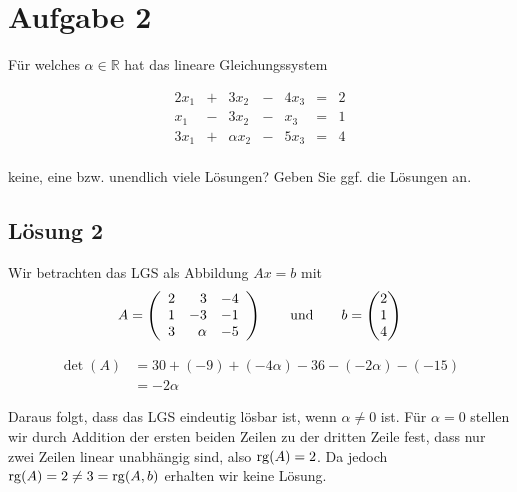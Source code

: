 \documentclass[main.tex]{subfiles}
\begin{document}
\section{Aufgabe 2}
Für welches $\alpha \in \mathbb{R}$ hat das lineare Gleichungssystem

$$
    \begin{array}{rcrcrcr}
        2x_1 & + & 3x_2 & - & 4x_3 & = & 2 \\
         x_1 & - & 3x_2 & - &  x_3 & = & 1 \\
        3x_1 & + & \alpha x_2 & - & 5x_3 & = & 4 \\        
    \end{array}
$$

keine, eine bzw. unendlich viele Lösungen? Geben Sie ggf. die Lösungen an.

\subsection{Lösung 2}
Wir betrachten das LGS als Abbildung $Ax=b$ mit 
$$
    A = \eqmatrix{rrr}{
        2 &  3 & -4 \\
        1 & -3 & -1 \\
        3 & \alpha & -5 \\
    }\qquad \text{und}
    \qquad
    b = \vektor{2 \\ 1 \\ 4}
$$

\begin{align*}
    \det (A) &= 30 + (-9) + (-4\alpha) -36 -(-2\alpha) -(-15) \\
             &= -2\alpha
\end{align*}

Daraus folgt, dass das LGS eindeutig lösbar ist, wenn $\alpha \neq 0$ ist. Für $\alpha = 0$ stellen wir durch Addition der ersten beiden Zeilen zu der dritten Zeile fest, dass nur zwei Zeilen linear unabhängig sind, also $\operatorname{rg} (A) = 2$.
Da jedoch $\operatorname{rg} (A) = 2 \neq 3 = \operatorname{rg}(A,b)$ erhalten wir keine Lösung.
\end{document}
